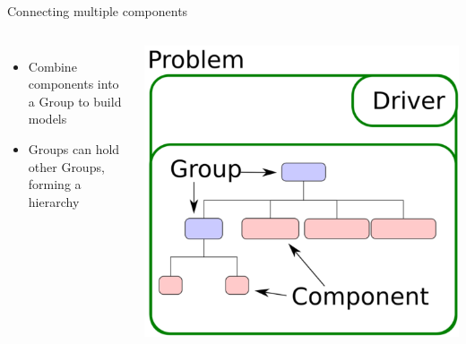 \documentclass[aspectratio=169, usenames,dvipsnames, 14pt]{beamer}
\begin{document}
\begin{frame}{Connecting multiple components}
\begin{columns}
        \begin{itemize}
            \item Combine components into a Group to build models
            \vspace{0.5cm}
            \item Groups can hold other Groups, forming a hierarchy
        \end{itemize}
    
        \includegraphics[scale=0.2]{images/arch1.png}
    \end{columns}
    
\end{frame}
\end{document}
